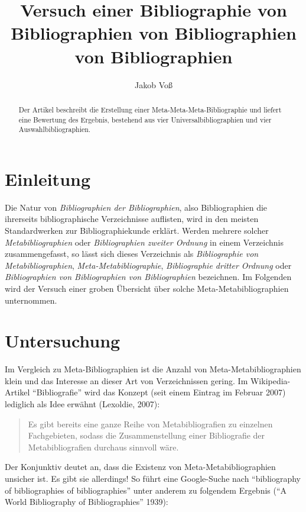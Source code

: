 \documentclass[a4paper,
fontsize=11pt,
oneside,
numbers=noperiodatend,
parskip=half-,
bibliography=totoc,
final
]{scrartcl}
\title{\LARGE{Versuch einer Bibliographie von Bibliographien von Bibliographien von Bibliographien}} %
\author{Jakob Voß} %
\date{}
\begin{document}
\maketitle
\thispagestyle{fancyplain} 

\begin{abstract}
Der Artikel beschreibt die Erstellung einer Meta-Meta-Meta-Bibliographie
und liefert eine Bewertung des Ergebnis, bestehend aus vier
Universalbibliographien und vier Auswahlbibliographien.
\end{abstract}

\section*{Einleitung}\label{einleitung}

Die Natur von \emph{Bibliographien der Bibliographien}, also
Bibliographien die ihrerseits bibliographische Verzeichnisse auflisten,
wird in den meisten Standardwerken zur Bibliographiekunde erklärt.
Werden mehrere solcher \emph{Metabibliographien} oder
\emph{Bibliographien zweiter Ordnung} in einem Verzeichnis
zusammengefasst, so lässt sich dieses Verzeichnis als
\emph{Bibliographie von Metabibliographien},
\emph{Meta-Metabibliographie}, \emph{Bibliographie dritter Ordnung} oder
\emph{Bibliographien von Bibliographien von Bibliographien} bezeichnen.
Im Folgenden wird der Versuch einer groben Übersicht über solche
Meta-Metabibliographien unternommen.

\section*{Untersuchung}\label{untersuchung}

Im Vergleich zu Meta-Bibliographien ist die Anzahl von
Meta-Metabibliographien klein und das Interesse an dieser Art von
Verzeichnissen gering. Im Wikipedia- Artikel \enquote{Bibliografie} wird
das Konzept (seit einem Eintrag im Februar 2007) lediglich als Idee
erwähnt (Lexoldie, 2007):

\begin{quote}
Es gibt bereits eine ganze Reihe von Metabibliografien zu einzelnen
Fachgebieten, sodass die Zusammenstellung einer Bibliografie der
Metabibliografien durchaus sinnvoll wäre.
\end{quote}

Der Konjunktiv deutet an, dass die Existenz von Meta-Metabibliographien
unsicher ist. Es gibt sie allerdings! So führt eine Google-Suche nach
\enquote{bibliography of bibliographies of bibliographies} unter anderem
zu folgendem Ergebnis (\enquote{A World Bibliography of Bibliographies}
1939):
\end{document}
